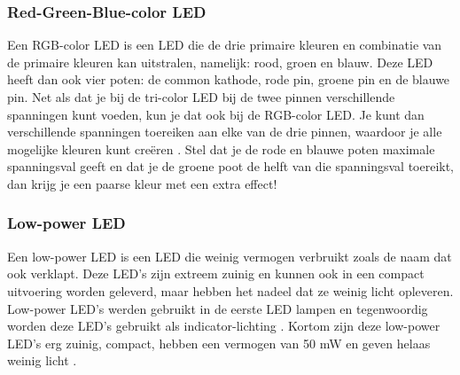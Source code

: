 \subsubsection{Red-Green-Blue-color LED}
Een RGB-color LED is een LED die de drie primaire kleuren en combinatie van de primaire kleuren kan uitstralen, namelijk: 
rood, groen en blauw. Deze LED heeft dan ook vier poten: de common kathode, 
rode pin, groene pin en de blauwe pin. Net als dat je bij de tri-color LED bij de 
twee pinnen verschillende spanningen kunt voeden, kun je dat ook bij de RGB-color LED.
Je kunt dan verschillende spanningen toereiken aan elke van de drie pinnen, waardoor je alle 
mogelijke kleuren kunt creëren \cite{RGBLEDPinout}. Stel dat je de rode en blauwe poten maximale spanningsval geeft 
en dat je de groene poot de helft van die spanningsval toereikt, dan krijg je een paarse kleur 
met een extra effect!
\\
\subsubsection{Low-power LED}
Een low-power LED is een LED die weinig vermogen verbruikt zoals de naam dat ook verklapt. Deze LED's zijn 
extreem zuinig en kunnen ook in een compact uitvoering worden geleverd, maar hebben het nadeel dat ze  weinig licht opleveren. Low-power LED's werden gebruikt 
in de eerste LED lampen en tegenwoordig worden deze LED's gebruikt als indicator-lichting \cite{LEDPower}. 
Kortom zijn deze low-power LED's erg zuinig, compact, hebben een vermogen van 50 mW en geven helaas weinig licht \cite{EAPL2835RA0}.
\\
